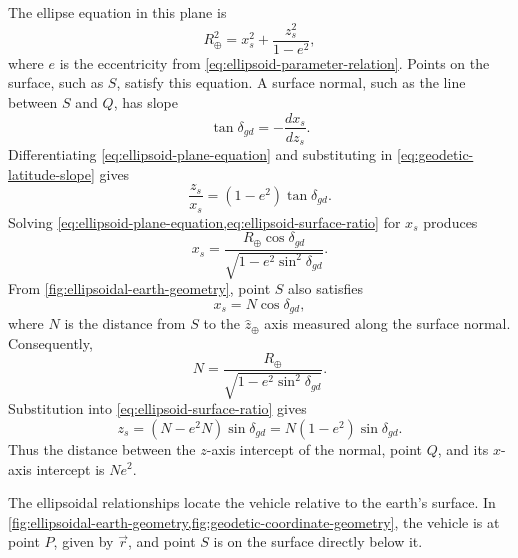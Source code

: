 The ellipse equation in this plane is
\begin{equation}
  R_{\oplus}^2=x_s^2+\frac{z_s^2}{1-e^2},
  \label{eq:ellipsoid-plane-equation}
\end{equation}
where $e$ is the eccentricity from \cref{eq:ellipsoid-parameter-relation}. Points on
the surface, such as $S$, satisfy this equation. A surface normal, such as the line
between $S$ and $Q$, has slope
\begin{equation}
  \tan\delta_{gd}=-\frac{d x_s}{d z_s}.
  \label{eq:geodetic-latitude-slope}
\end{equation}
Differentiating \cref{eq:ellipsoid-plane-equation} and substituting in
\cref{eq:geodetic-latitude-slope} gives
\begin{equation}
  \frac{z_s}{x_s}=(1-e^2)\tan\delta_{gd}.
  \label{eq:ellipsoid-surface-ratio}
\end{equation}
Solving \cref{eq:ellipsoid-plane-equation,eq:ellipsoid-surface-ratio} for $x_s$
produces
\begin{equation}
  x_s=\frac{R_{\oplus}\cos\delta_{gd}}
           {\sqrt{1-e^2\sin^2\delta_{gd}}}.
  \label{eq:ellipsoid-xs}
\end{equation}
From \cref{fig:ellipsoidal-earth-geometry}, point $S$ also satisfies
\begin{equation}
  x_s=N\cos\delta_{gd},
  \label{eq:ellipsoid-xs-normal}
\end{equation}
where $N$ is the distance from $S$ to the $\hat{z}_{\oplus}$ axis measured along the
surface normal. Consequently,
\begin{equation}
  N=\frac{R_{\oplus}}
          {\sqrt{1-e^2\sin^2\delta_{gd}}}.
  \label{eq:ellipsoid-normal-distance}
\end{equation}
Substitution into \cref{eq:ellipsoid-surface-ratio} gives
\begin{equation}
  z_s=(N-e^2N)\sin\delta_{gd}
     =N(1-e^2)\sin\delta_{gd}.
  \label{eq:ellipsoid-zs}
\end{equation}
Thus the distance between the $z$-axis intercept of the normal, point $Q$, and its
$x$-axis intercept is $Ne^2$.


The ellipsoidal relationships locate the vehicle relative to the earth's surface. In
\cref{fig:ellipsoidal-earth-geometry,fig:geodetic-coordinate-geometry}, the vehicle
is at point $P$, given by $\vec{r}$, and point $S$ is on the surface directly below it.


